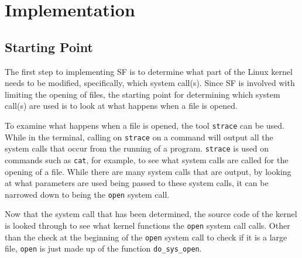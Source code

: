 \section{Implementation}
\subsection*{Starting Point}
The first step to implementing SF is to determine what part of the Linux kernel needs to be modified, specifically, which system call(s). Since SF is involved with limiting the opening of files, the starting point for determining which system call(s) are used is to look at what happens when a file is opened.

To examine what happens when a file is opened, the tool \texttt{strace} can be used. While in the terminal, calling on \texttt{strace} on a command will output all the system calls that occur from the running of a program. \texttt{strace} is used on commands such as \texttt{cat}, for example, to see what system calls are called for the opening of a file. While there are many system calls that are output, by looking at what parameters are used being passed to these system calls, it can be narrowed down to being the \texttt{open} system call.

Now that the system call that has been determined, the source code of the kernel is looked through to see what kernel functions the \texttt{open} system call calls. Other than the check at the beginning of the \texttt{open} system call to check if it is a large file, \texttt{open} is just made up of the function \texttt{do\_sys\_open}.  